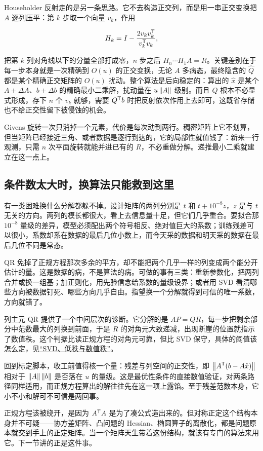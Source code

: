 Householder 反射走的是另一条思路。它不去构造正交列，而是用一串正交变换把 \(A\) 逐列压平：第 \(k\) 步取一个向量 \(v_k\)，作用

\[
H_k=I-\frac{2v_kv_k^{\mathsf{T}}}{v_k^{\mathsf{T}}v_k},
\]

把第 \(k\) 列对角线以下的分量全部打成零，\(n\) 步之后 \(H_n\cdots H_1A=R\)。关键差别在于每一步本身就是一次精确到 \(O(u)\) 的正交变换，无论 \(A\) 多病态，最终隐含的 \(\hat Q\) 都是某个精确正交矩阵的 \(O(u)\) 扰动。整个算法是后向稳定的：算出的 \(\hat x\) 是某个 \(A+\Delta A\)、\(b+\Delta b\) 的精确最小二乘解，扰动量在 \(u\left\lVert A\right\rVert\) 级别。而且 \(Q\) 根本不必显式形成，存下 \(n\) 个 \(v_k\) 就够，需要 \(Q^{\mathsf{T}}b\) 时把反射依次作用上去即可，这既省存储也不给正交性留下被侵蚀的机会。

Givens 旋转一次只消掉一个元素，代价是每次动到两行。稠密矩阵上它不划算，但当矩阵已经接近三角、或者数据是逐行到达的，它的局部性就值钱了：新来一行观测，只需 \(n\) 次平面旋转就能并进已有的 \(R\)，不必重做分解。递推最小二乘就建立在这一点上。

\subsection{条件数太大时，换算法只能救到这里}

有一类困难换什么分解都躲不掉。设计矩阵的两列分别是 \(t\) 和 \(t+10^{-8}z\)，\(z\) 是与 \(t\) 无关的方向。两列的模长都很大，看上去信息量十足，但它们几乎重合。要拟合那 \(10^{-8}\) 量级的差异，模型必须配出两个符号相反、绝对值巨大的系数；训练残差可以很小，系数却系在数据的最后几位小数上，而今天采的数据和明天采的数据在最后几位不同是常态。

QR 免掉了正规方程那次多余的平方，却不能把两个几乎一样的列变成两个能分开估计的量。这是数据的病，不是算法的病。可做的事有三类：重新参数化，把两列合并或换一组基；加正则化，用先验信念给系数的量级设界；或者用 SVD 看清哪些方向被数据钉死、哪些方向几乎自由。指望换一个分解就得到可信的唯一系数，方向就错了。

列主元 QR 提供了一个中间层次的诊断。它分解的是 \(AP=QR\)，每一步把剩余部分中范数最大的列换到前面，于是 \(R\) 的对角元大致递减，出现断崖的位置就指示了数值秩。这个判据比读正规方程的对角元可靠，但比 SVD 保守，具体的阈值该怎么定，见\hyperref[sec:08-Numerical-Analysis/05-Numerical-Linear-Algebra/06]{``SVD、低秩与数值秩''}。

回到标定脚本，收工前值得核一个量：残差与列空间的正交性，即 \(\left\lVert A^{\mathsf{T}}(b-A\hat x)\right\rVert\) 相对于 \(\left\lVert A\right\rVert\left\lVert b\right\rVert\) 是否落在 \(u\) 的量级。这是最优性条件的直接数值验证，对两条路径同样适用，而正规方程算出的解往往先在这一项上露馅。至于残差范数本身，它小不小和解可不可信是两回事。

正规方程该被绕开，是因为 \(A^{\mathsf{T}}A\) 是为了凑公式造出来的。但对称正定这个结构本身并不可疑——协方差矩阵、凸问题的 Hessian、椭圆算子的离散化，都是问题原本就交到手上的正定矩阵。当一个矩阵天生带着这份结构，就该有专门的算法来用它。下一节讲的正是这件事。
